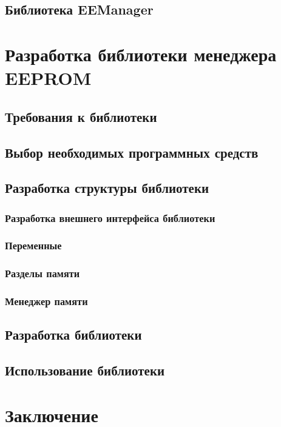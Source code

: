 \documentclass{report}
\begin{document}
\section{Библиотека EEManager}


\chapter{Разработка библиотеки менеджера EEPROM}

\section{Требования к библиотеки}

\section{Выбор необходимых программных средств}

\section{Разработка структуры библиотеки}

\subsection{Разработка внешнего интерфейса библиотеки}

\subsection{Переменные}

\subsection{Разделы памяти}

\subsection{Менеджер памяти}

\section{Разработка библиотеки}

\section{Использование библиотеки}


\chapter*{Заключение}



\end{document}

